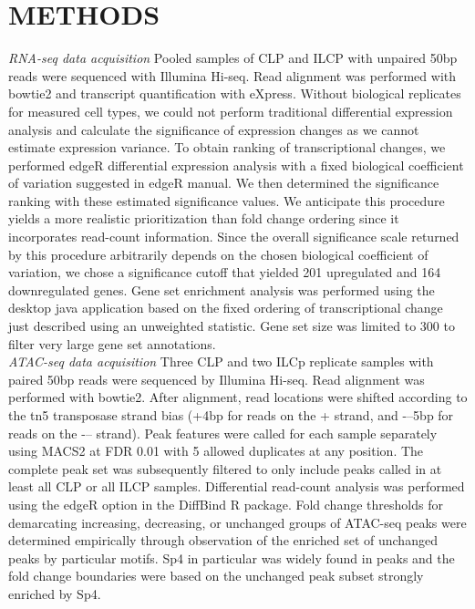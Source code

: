 \section{METHODS}

\textit{RNA-seq data acquisition} Pooled samples of CLP and ILCP with unpaired 50bp reads were sequenced with Illumina Hi-seq. Read alignment was performed with bowtie2 and transcript quantification with eXpress. Without biological replicates for measured cell types, we could not perform traditional differential expression analysis and calculate the significance of expression changes as we cannot estimate expression variance. To obtain ranking of transcriptional changes, we performed edgeR differential expression analysis with a fixed biological coefficient of variation suggested in edgeR manual. We then determined the significance ranking with these estimated significance values. We anticipate this procedure yields a more realistic prioritization than fold change ordering since it incorporates read-count information. Since the overall significance scale returned by this procedure arbitrarily depends on the chosen biological coefficient of variation, we chose a significance cutoff that yielded 201 upregulated and 164 downregulated genes. Gene set enrichment analysis was performed using the desktop java application based on the fixed ordering of transcriptional change just described using an unweighted statistic. Gene set size was limited to 300 to filter very large gene set annotations. 
\\
\textit{ATAC-seq data acquisition} Three CLP and two ILCp replicate samples with paired 50bp reads were sequenced by Illumina Hi-seq. Read alignment was performed with bowtie2. After alignment, read locations were shifted according to the tn5 transposase strand bias (+4bp for reads on the  + strand, and -–5bp for reads on the -– strand). Peak features were called for each sample separately using MACS2 at FDR 0.01 with 5 allowed duplicates at any position. The complete peak set was subsequently filtered to only include peaks called in at least all CLP or all ILCP samples. Differential read-count analysis was performed using the edgeR option in the DiffBind R package. Fold change thresholds for demarcating increasing, decreasing, or unchanged groups of ATAC-seq peaks were determined empirically through observation of the enriched set of unchanged peaks by particular motifs. Sp4 in particular was widely found in peaks and the fold change boundaries were based on the unchanged peak subset strongly enriched by Sp4. 
\\
